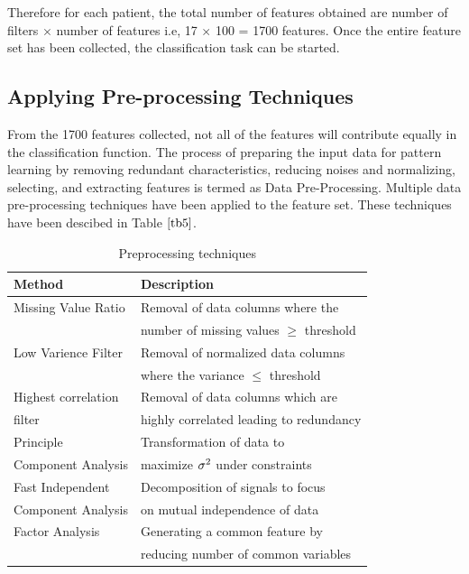 \documentclass[final,1p,times,twocolumn]{elsarticle}
\begin{document}
Therefore for each patient, the total number of features obtained are number of filters $\times$ number of features i.e, 17 $\times$ 100 = 1700 features. Once the entire feature set has been collected, the classification task can be started. 

\subsection{Applying Pre-processing Techniques}

From the 1700 features collected, not all of the features will contribute equally in the classification function. The process of preparing the input data for pattern learning by removing redundant characteristics, reducing noises and normalizing, selecting, and extracting features is termed as Data Pre-Processing. Multiple data pre-processing techniques have been applied to the feature set. These techniques have been descibed in Table $\ref{tb5}$.

\begin{table}[!b]
\scriptsize
\centering
\caption{Preprocessing techniques}
\label{tb5}
\begin{tabular}{| l | l |}
\hline
\textbf{Method} & \textbf{Description}\\
\hline
Missing Value Ratio & Removal of data columns where the  \\
&number of missing values $\geq$ threshold\\
\hline
Low Varience Filter & Removal of normalized data columns \\
&where the variance $\leq$ threshold\\
\hline
Highest correlation  & Removal of data columns which are \\
filter&highly correlated leading to redundancy\\
\hline
Principle & Transformation of data to\\
Component Analysis &maximize $\sigma\textsuperscript{2}$ under constraints\\
\hline
Fast Independent & Decomposition of signals to focus  \\
Component Analysis &on mutual independence of data\\
\hline
Factor Analysis & Generating a common feature by \\
&reducing number of common variables \\
\hline
\end{tabular}
\end{table}
\end{document}
